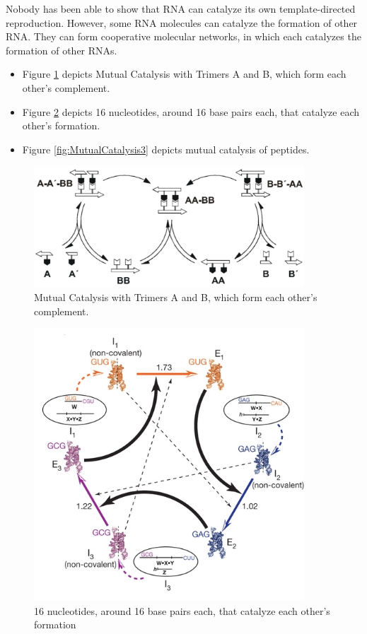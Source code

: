 \documentclass[]{article}
\begin{document}
Nobody has been able to show that RNA can catalyze its own template-directed reproduction. However, some RNA molecules can catalyze the formation of other RNA. They can form cooperative molecular networks, in which each catalyzes the formation of other RNAs.

\begin{itemize}
	\item Figure \ref{fig:MutualCatalysis1} depicts Mutual Catalysis with Trimers A and B, which form each other's complement\cite{patzke2007self}.
	\item Figure \ref{fig:MutualCatalysis2} depicts 16 nucleotides, around 16 base pairs each, that catalyze each other's formation\cite{vaidya2012spontaneous}.
	\item Figure \ref{fig:MutualCatalysis3} depicts mutual catalysis of peptides\cite{ashkenasy2004design}.
\end{itemize}

\begin{figure}[H]
	\caption{Mutual Catalysis with Trimers A and B, which form each other's complement.}\label{fig:MutualCatalysis1}
	\includegraphics[width=0.9\textwidth]{MutualCatalysis1}
\end{figure}


\begin{figure}[H]
	\caption{16 nucleotides, around 16 base pairs each, that catalyze each other's formation}\label{fig:MutualCatalysis2}
	\includegraphics[width=0.9\textwidth]{MutualCatalysis2}
\end{figure}
\end{document}
